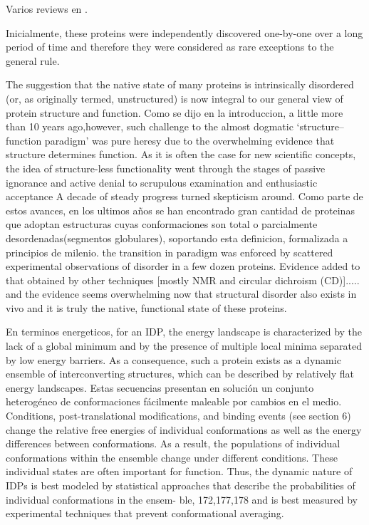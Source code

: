 Varios reviews en \cite{uversky2010understanding,dyson2005intrinsically}.

Inicialmente, these proteins were independently discovered one-by-one over a long period of time and therefore they were considered as rare exceptions to the general rule.

The suggestion that the native state of many proteins is intrinsically disordered (or, as originally termed, unstructured) is now integral to our general view of protein structure and function.
Como se dijo en la introduccion, a little more than 10 years ago,however, such challenge to the almost dogmatic ‘structure–function paradigm’ was pure heresy due to the overwhelming evidence that structure determines function.
As it is often the case for new scientific concepts, the idea of structure-less functionality went through the stages of passive ignorance and active denial to scrupulous examination and enthusiastic acceptance
A decade of steady progress turned skepticism around.
Como parte de estos avances, en los ultimos años se han encontrado gran cantidad de proteinas que adoptan estructuras cuyas conformaciones son total o parcialmente desordenadas(segmentos globulares), soportando esta definicion, formalizada a principios de milenio. 
the transition in paradigm was enforced by scattered experimental observations of disorder in a few dozen proteins. 
Evidence added to that obtained by other techniques [mostly NMR and circular dichroism (CD)]..... and the evidence seems overwhelming now that structural disorder also exists in vivo and it is truly the native, functional state of these proteins.

En terminos energeticos, for an IDP, the energy landscape is characterized by the lack of a global minimum and by the presence of multiple local minima separated by low energy barriers. 
As a consequence, such a protein exists as a dynamic ensemble of interconverting structures, which can be described by relatively flat energy landscapes.
Estas secuencias presentan en solución un conjunto heterogéneo de conformaciones fácilmente maleable por cambios en el medio. 
Conditions, post-translational modifications,
and binding events (see section 6) change the relative free
energies of individual conformations as well as the energy
differences between conformations.
As a result, the
populations of individual conformations within the ensemble
change under different conditions. These individual states are
often important for function. Thus, the dynamic nature of IDPs is
best modeled by statistical approaches that describe the
probabilities of individual conformations in the ensem-
ble, 172,177,178 and is best measured by experimental techniques
that prevent conformational averaging.

